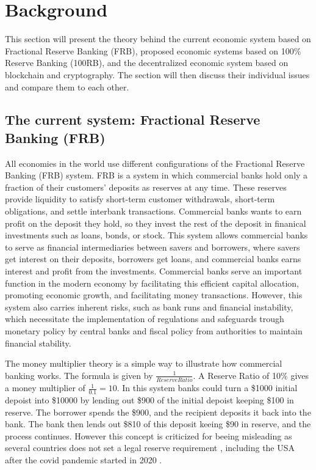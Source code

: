 \section{Background}
This section will present the theory behind the current economic system based on Fractional Reserve Banking (FRB), 
proposed economic systems based on 100\% Reserve Banking (100RB), and the decentralized economic system based on blockchain and cryptography. 
The section will then discuss their individual issues and compare them to each other.


\subsection{The current system: Fractional Reserve Banking (FRB)}
All economies in the world use different configurations of the Fractional Reserve Banking (FRB) system. FRB is a system in which commercial banks hold only a fraction of their customers' deposits as reserves at any time. These reserves provide liquidity to satisfy short-term customer withdrawals, short-term obligations, and settle interbank transactions. Commercial banks wants to earn profit on the deposit they hold, so they invest the rest of the deposit in finanical investments such as loans, bonds, or stock. This system allows commercial banks to serve as financial intermediaries between savers and borrowers, where savers get interest on their deposits, borrowers get loans, and commercial banks earns interest and profit from the investments. Commercial banks serve an important function in the modern economy by facilitating this efficient capital allocation, promoting economic growth, and facilitating money transactions. However, this system also carries inherent risks, such as bank runs and financial instability, which necessitate the implementation of regulations and safeguards trough monetary policy by central banks and fiscal policy from authorities to maintain financial stability. 

The money multiplier theory is a simple way to illustrate how commercial banking works. The formula is given by $\frac{1}{Reserve Ratio}$. A Reserve Ratio of 10\% gives a money multiplier of $\frac{1}{0.1}=10$. In this system banks could turn a \$1000 initial depoist into \$10000 by lending out \$900 of the initial depoist keeping \$100 in reserve. The borrower spends the \$900, and the recipient deposits it back into the bank. The bank then lends out \$810 of this deposit keeing \$90 in reserve, and the process continues. However this concept is criticized for beeing misleading as several countries does not set a legal reserve requirement \cite{chicagorevisited}, including the USA after the covid pandemic started in 2020 \cite{FRBinvestopedia}. 

